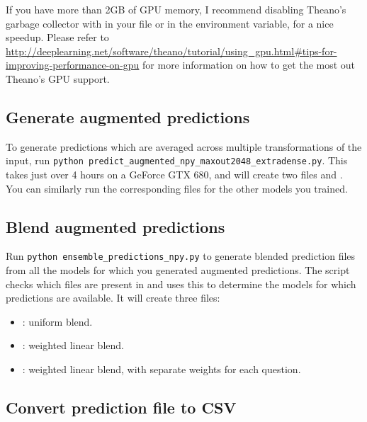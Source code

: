 \documentclass[a4paper,10pt]{article}
\begin{document}
If you have more than 2GB of GPU memory, I recommend disabling Theano's garbage collector with  in your  file or in the  environment variable, for a nice speedup. Please refer to \url{http://deeplearning.net/software/theano/tutorial/using_gpu.html#tips-for-improving-performance-on-gpu} for more information on how to get the most out Theano's GPU support.

\subsection{Generate augmented predictions}

To generate predictions which are averaged across multiple transformations of the input, run \texttt{python predict\_augmented\_npy\_maxout2048\_extradense.py}. This takes just over 4 hours on a GeForce GTX 680, and will create two files  and  . You can similarly run the corresponding  files for the other models you trained. 

\subsection{Blend augmented predictions}

Run \texttt{python ensemble\_predictions\_npy.py} to generate blended prediction files from all the models for which you generated augmented predictions. The script checks which files are present in  and uses this to determine the models for which predictions are available. It will create three files:
\begin{itemize}
 \item {}: uniform blend.
 \item {}: weighted linear blend.
 \item {}: weighted linear blend, with separate weights for each question.
\end{itemize}

\subsection{Convert prediction file to CSV}
\end{document}
